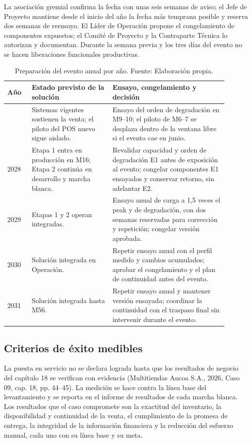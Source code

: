 \documentclass[11pt]{article}
\begin{document}
La asociación gremial confirma la fecha con unas seis semanas de aviso; el Jefe de Proyecto mantiene desde el inicio del año la fecha más temprana posible y reserva dos semanas de reensayo. El Líder de Operación propone el congelamiento de componentes expuestos; el Comité de Proyecto y la Contraparte Técnica lo autorizan y documentan. Durante la semana previa y los tres días del evento no se hacen liberaciones funcionales productivas.


\begin{longtable}{@{}p{0.10\linewidth}p{0.33\linewidth}p{0.47\linewidth}@{}}
\caption[Preparación del evento anual por año]{Preparación del evento anual por año. Fuente: Elaboración propia.}\label{tab:t18-4}\\
\toprule
\textbf{Año} & \textbf{Estado previsto de la solución} & \textbf{Ensayo, congelamiento y decisión} \\
\midrule
\endhead
\bottomrule
\endlastfoot
2027 & Sistemas vigentes sostienen la venta; el piloto del POS nuevo sigue aislado. & Ensayo del orden de degradación en M9--10; el piloto de M6--7 se desplaza dentro de la ventana libre si el evento cae en junio. \\
2028 & Etapa 1 entra en producción en M16; Etapa 2 continúa en desarrollo y marcha blanca. & Revalidar capacidad y orden de degradación E1 antes de exposición al evento; congelar componentes E1 ensayados y conservar retorno, sin adelantar E2. \\
2029 & Etapas 1 y 2 operan integradas. & Ensayo anual de carga a 1,5 veces el peak y de degradación, con dos semanas reservadas para corrección y repetición; congelar versión aprobada. \\
2030 & Solución integrada en Operación. & Repetir ensayo anual con el perfil medido y cambios acumulados; aprobar el congelamiento y el plan de continuidad antes del evento. \\
2031 & Solución integrada hasta M56. & Repetir ensayo anual y mantener versión ensayada; coordinar la continuidad con el traspaso final sin intervenir durante el evento. \\
\end{longtable}

\subsection*{Criterios de éxito medibles}

La puesta en servicio no se declara lograda hasta que los resultados de negocio del capítulo 18 se verifican con evidencia (Multitiendas Ancoa S.A., 2026, Caso 09, cap. 18, pp. 44–45). La medición se hace contra la línea base del levantamiento y se reporta en el informe de resultados de cada marcha blanca. Los resultados que el caso compromete son la exactitud del inventario, la disponibilidad y continuidad de la venta, el cumplimiento de la promesa de entrega, la integridad de la información financiera y la reducción del esfuerzo manual, cada uno con su línea base y su meta.
\end{document}

